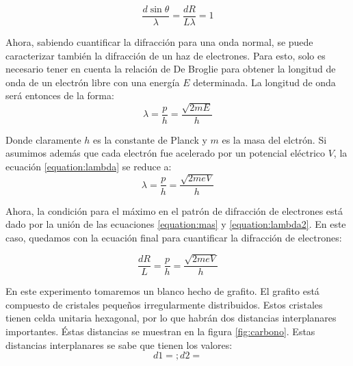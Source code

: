 \documentclass[%
 reprint,
 amsmath,amssymb,
 aps,
]{revtex4-1}
\begin{document}
\begin{equation}
\frac{d\sin{\theta}}{\lambda} = \frac{dR}{L\lambda} = 1
\label{equation:mas}
\end{equation}

Ahora, sabiendo cuantificar la difracción para una onda normal, se puede caracterizar también la difracción de un haz de electrones. Para esto, solo es necesario tener en cuenta la relación de De Broglie para obtener la longitud de onda de un electrón libre con una energía $E$ determinada. La longitud de onda será entonces de la forma:\\

\begin{equation}
\lambda = \frac{p}{h} = \frac{\sqrt{2mE}}{h}
\label{equation:lambda}
\end{equation}

Donde claramente $h$ es la constante de Planck y $m$ es la masa del elctrón. Si asumimos además que cada electrón fue acelerado por un potencial eléctrico $V$, la ecuación \ref{equation:lambda} se reduce a:\\

\begin{equation}
\lambda = \frac{p}{h} = \frac{\sqrt{2meV}}{h}
\label{equation:lambda2}
\end{equation}

Ahora, la condición para el máximo en el patrón de difracción de electrones está dado por la unión de las ecuaciones \ref{equation:mas} y \ref{equation:lambda2}. En este caso, quedamos con la ecuación final para cuantificar la difracción de electrones: 

 \begin{equation}
\frac{dR}{L} = \frac{p}{h} = \frac{\sqrt{2meV}}{h}
\label{equation:lambda2}
\end{equation}

En este experimento tomaremos un blanco hecho de grafito. El grafito está compuesto de cristales pequeños irregularmente distribuidos. Estos cristales tienen celda unitaria hexagonal, por lo que habrán dos distancias interplanares importantes. Éstas distancias se muestran en la figura \ref{fig:carbono}. Estas distancias interplanares se sabe que tienen los valores:\\

\begin{equation}
d1 = ; d2 = 
\label{equation:carbono}
\end{equation}

\end{document}
